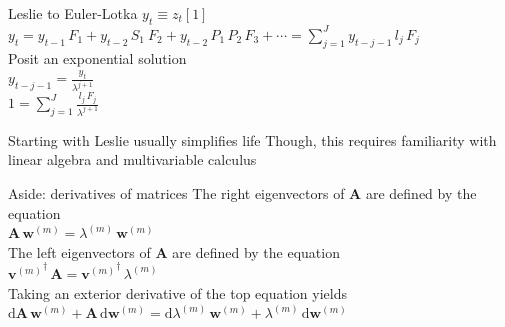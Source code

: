 \documentclass{beamer}
\begin{document}
\begin{frame}{Leslie to Euler-Lotka}
  $y_t \equiv z_t[1]$\\
  \vspace{.5cm}
  $y_t = y_{t-1} \, F_1 + y_{t-2} \, S_1 \ F_2 + y_{t-2} \, P_1 \, P_2 \, F_3 + \cdots = \displaystyle\sum\limits_{j=1}^{J} y_{t-j-1} \, l_j \, F_j$\\
  \vspace{.5cm}
  Posit an exponential solution\\
  \vspace{.5cm}
  $y_{t-j-1} = \frac{y_t}{\lambda^{j+1}}$\\
  \vspace{.5cm}
  $1 = \displaystyle\sum\limits_{j=1}^{J} \frac{l_j \, F_j}{\lambda^{j+1}}$\\
\end{frame}

\begin{frame}{Starting with Leslie usually simplifies life}
  Though, this requires familiarity with linear algebra and multivariable calculus
\end{frame}

\begin{frame}{Aside: derivatives of matrices}
  The right eigenvectors of $\mathbf{A}$ are defined by the equation\\
  \vspace{.5cm}
  $\mathbf{A} \, \mathbf{w}^{(m)} = \lambda^{(m)} \, \mathbf{w}^{(m)}$\\
  \vspace{.5cm}
  The left eigenvectors of $\mathbf{A}$ are defined by the equation\\
  ${\mathbf{v}^{(m)}}^{\dagger} \, \mathbf{A} =	{\mathbf{v}^{(m)}}^{\dagger} \, \lambda^{(m)}$\\
  \vspace{.5cm}
  Taking an exterior derivative of the top equation yields\\
  \vspace{.5cm}
  $\mathrm{d}\mathbf{A} \, \mathbf{w}^{(m)} + \mathbf{A} \, \mathrm{d}\mathbf{w}^{(m)}= \mathrm{d}\lambda^{(m)} \, \mathbf{w}^{(m)} + \lambda^{(m)} \, \mathrm{d}\mathbf{w}^{(m)}$\\
\end{frame}
\end{document}
